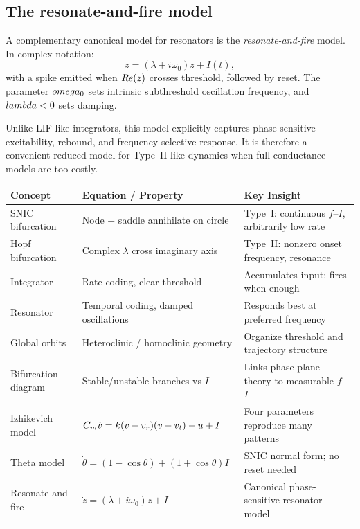 \subsection{The resonate-and-fire model}

A complementary canonical model for resonators is the \emph{resonate-and-fire} model. In complex notation:
%
\begin{equation}
  \dot z = (\lambda + i\omega_0)z + I(t),
  \label{eq:resonate-fire}
\end{equation}
%
with a spike emitted when $\\Re(z)$ crosses threshold, followed by reset. The parameter $\\omega_0$ sets intrinsic subthreshold oscillation frequency, and $\\lambda<0$ sets damping.

Unlike LIF-like integrators, this model explicitly captures phase-sensitive excitability, rebound, and frequency-selective response. It is therefore a convenient reduced model for Type~II-like dynamics when full conductance models are too costly.


\begin{chaptersummary}

\begin{center}
\renewcommand{\arraystretch}{1.6}
\begin{tabularx}{\textwidth}{@{}l X X@{}}
  \toprule
  \textbf{Concept} & \textbf{Equation / Property} & \textbf{Key Insight} \\
  \midrule
  SNIC bifurcation &
  Node + saddle annihilate on circle &
  Type~I: continuous $f$--$I$, arbitrarily low rate \\
  Hopf bifurcation &
  Complex $\lambda$ cross imaginary axis &
  Type~II: nonzero onset frequency, resonance \\
  Integrator &
  Rate coding, clear threshold &
  Accumulates input; fires when enough \\
  Resonator &
  Temporal coding, damped oscillations &
  Responds best at preferred frequency \\
  Global orbits &
  Heteroclinic / homoclinic geometry &
  Organize threshold and trajectory structure \\
  Bifurcation diagram &
  Stable/unstable branches vs $I$ &
  Links phase-plane theory to measurable $f$--$I$ \\
  Izhikevich model &
  $C_m\dot{v} = k(v - v_r)(v - v_t) - u + I$ &
  Four parameters reproduce many patterns \\
  Theta model &
  $\dot\theta = (1 - \cos\theta) + (1 + \cos\theta)I$ &
  SNIC normal form; no reset needed \\
  Resonate-and-fire &
  $\dot z = (\lambda + i\omega_0)z + I$ &
  Canonical phase-sensitive resonator model \\
  \bottomrule
\end{tabularx}
\end{center}

\end{chaptersummary}

